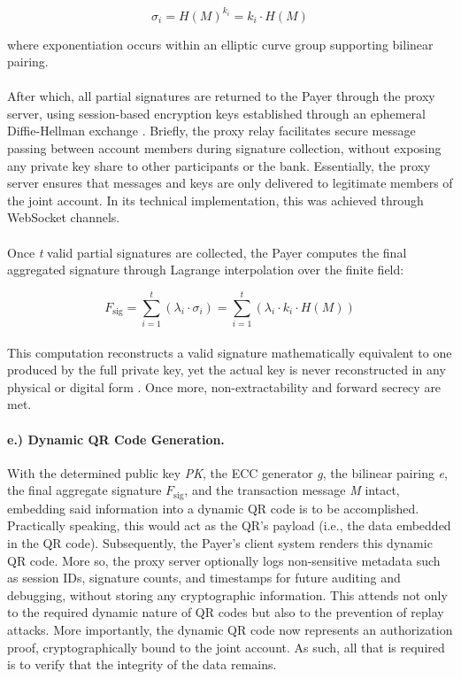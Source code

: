 \documentclass[a4paper]{scl-article}
\begin{document}
\[
\sigma_i = H(\textit{M})^{k_i} = k_i \cdot H(\textit{M})
\]

where exponentiation occurs within an elliptic curve group supporting bilinear pairing.

\paragraph{}After which, all partial signatures are returned to the Payer through the proxy server, using session-based encryption keys established through an ephemeral Diffie-Hellman exchange \cite{chen2011}. Briefly, the proxy relay facilitates secure message passing between account members during signature collection, without exposing any private key share to other participants or the bank. Essentially, the proxy server ensures that messages and keys are only delivered to legitimate members of the joint account. In its technical implementation, this was achieved through WebSocket channels.

\paragraph{}Once \textit{t} valid partial signatures are collected, the Payer computes the final aggregated signature through Lagrange interpolation over the finite field:

\[
F_{\text{sig}} = \sum_{i=1}^{t} (\lambda_i \cdot \sigma_i)
              = \sum_{i=1}^{t} (\lambda_i \cdot k_i \cdot H(M))
\]

\paragraph{}This computation reconstructs a valid signature mathematically equivalent to one produced by the full private key, yet the actual key is never reconstructed in any physical or digital form \cite{shamir1979, komlo2021}.
Once more, non-extractability and forward secrecy are met.

\paragraph{e.) Dynamic QR Code Generation.}
With the determined public key \textit{PK}, the ECC generator \textit{g}, the bilinear pairing \textit{e}, the final aggregate signature $F_{\text{sig}}$, and the transaction message \textit{M} intact, embedding said information into a dynamic QR code is to be accomplished. Practically speaking, this would act as the QR’s payload (i.e., the data embedded in the QR code). Subsequently, the Payer’s client system renders this dynamic QR code. More so, the proxy server optionally logs non-sensitive metadata such as session IDs, signature counts, and timestamps for future auditing and debugging, without storing any cryptographic information. This attends not only to the required dynamic nature of QR codes but also to the prevention of replay attacks. More importantly, the dynamic QR code now represents an authorization proof, cryptographically bound to the joint account. As such, all that is required is to verify that the integrity of the data remains.
\end{document}

